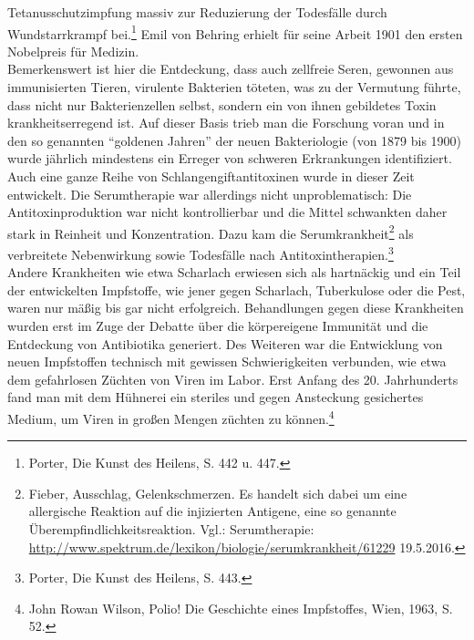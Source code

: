\documentclass[
    a4paper,
    12pt,
    hyphens,
    chapterprefix=true,
    headheight=33pt,
    footheight=29pt,
    headings=optiontohead, %
]{scrartcl}
\begin{document}
Tetanusschutzimpfung massiv zur Reduzierung der Todesfälle durch Wundstarrkrampf bei.\footnote{Porter, Die Kunst des Heilens,
S. 442 u. 447.} Emil von Behring erhielt für seine Arbeit 1901 den ersten Nobelpreis für Medizin.\\
Bemerkenswert ist hier die Entdeckung, dass auch zellfreie Seren, gewonnen aus immunisierten Tieren, virulente Bakterien töteten, was zu der Vermutung führte, dass nicht nur Bakterienzellen selbst, sondern ein von ihnen gebildetes Toxin krankheitserregend ist. Auf dieser Basis trieb man die Forschung voran und in den so genannten "`goldenen Jahren"' der neuen Bakteriologie (von 1879 bis 1900) wurde jährlich mindestens ein Erreger von schweren Erkrankungen identifiziert. Auch eine ganze Reihe von Schlangengiftantitoxinen wurde in dieser Zeit entwickelt. Die Serumtherapie war allerdings nicht unproblematisch: Die Antitoxinproduktion war nicht kontrollierbar
und die Mittel schwankten daher stark in Reinheit und Konzentration. Dazu kam die Serumkrankheit\footnote{Fieber, Ausschlag,
Gelenkschmerzen. Es handelt sich dabei um eine allergische Reaktion auf die injizierten Antigene, eine so genannte
Überempfindlichkeitsreaktion. Vgl.: Serumtherapie: \url{http://www.spektrum.de/lexikon/biologie/serumkrankheit/61229} 19.5.2016.}
als verbreitete Nebenwirkung sowie Todesfälle nach Antitoxintherapien.\footnote{Porter, Die Kunst des Heilens, S. 443.}\\
Andere Krankheiten wie etwa Scharlach erwiesen sich als hartnäckig und ein Teil der entwickelten Impfstoffe, wie jener gegen Scharlach, Tuberkulose oder die Pest, waren nur mäßig bis gar nicht erfolgreich. Behandlungen gegen diese Krankheiten wurden erst im Zuge der Debatte über die körpereigene Immunität und die Entdeckung von Antibiotika generiert. Des Weiteren war die Entwicklung von neuen Impfstoffen technisch mit gewissen Schwierigkeiten verbunden, wie etwa dem gefahrlosen Züchten von Viren im Labor. Erst Anfang des 20. Jahrhunderts fand man mit dem Hühnerei ein steriles und gegen Ansteckung gesichertes Medium, um Viren in großen Mengen züchten zu können.\footnote{John Rowan Wilson, Polio! Die Geschichte eines Impfstoffes, Wien, 1963, S. 52.}
\end{document}
